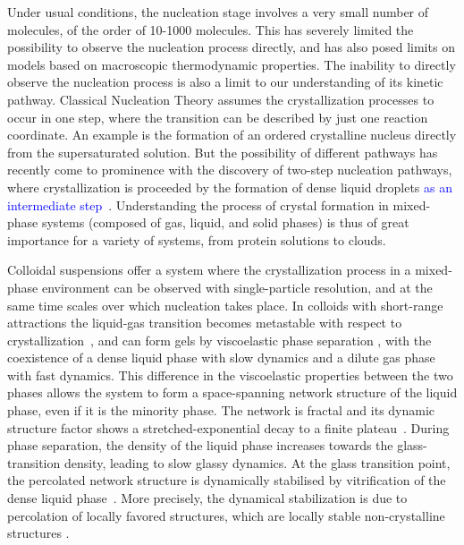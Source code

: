 \documentclass[12pt]{article}
\begin{document}
Under usual conditions, the nucleation stage involves a very small number of molecules, of the order of 10-1000 molecules.
This has severely limited the possibility to observe the nucleation process directly, and has also posed limits on
models based on macroscopic thermodynamic properties. 
The inability to directly observe the nucleation process is also a limit to our understanding of its kinetic pathway. 
Classical Nucleation Theory assumes the crystallization processes to occur in one step,
where the transition can be described by just one reaction coordinate. An example is the formation of an ordered crystalline nucleus
directly from the supersaturated solution. But the possibility of different pathways has recently come to prominence with
the discovery of two-step nucleation pathways, where crystallization is proceeded by the formation of dense liquid  droplets \textcolor{blue}{as an intermediate step}~\cite{ten1997enhancement,SearR,savage2009experimental,vekilov2010two,palberg2014crystallization}.
Understanding the process of crystal formation in mixed-phase systems (composed of gas, liquid, and solid phases) is thus
of great importance for a variety of systems, from protein solutions to clouds. 

Colloidal suspensions offer a system where the crystallization process in a mixed-phase environment can be observed with single-particle
resolution, and at the same time scales over which nucleation takes place. In colloids with short-range attractions the liquid-gas transition 
becomes metastable with respect to crystallization~\cite{anderson2002insights,lekkerkerker2011colloids}, and can form gels
by viscoelastic phase separation \cite{tanaka1999colloid,tanaka2000viscoelastic}, with the coexistence of a dense liquid phase with slow dynamics and a dilute gas phase with fast dynamics. 
This difference in the viscoelastic properties between the two phases allows the system to form a space-spanning 
network structure of the liquid phase, even if it is the minority phase. The network is fractal and its dynamic structure factor shows a stretched-exponential decay to a finite
plateau~\cite{krall1998internal,solomon2001dynamic,romer2000sol}. 
During phase separation, the density of the liquid phase increases towards the glass-transition density, leading to slow glassy dynamics.
At the glass transition point, the percolated network structure is dynamically stabilised by vitrification 
of the dense liquid phase~\cite{pusey1993dynamics,ilett1995phase,verhaegh1997transient,tanaka1999colloid,foffi2002,buzzaccaro2007sticky,zaccarelli2007,lu2008gelation,zaccarelli2008gelation,testard2011}.  
More precisely, the dynamical stabilization is due to percolation of locally favored structures, which are locally stable non-crystalline structures \cite{royall2008g}.
\end{document}
